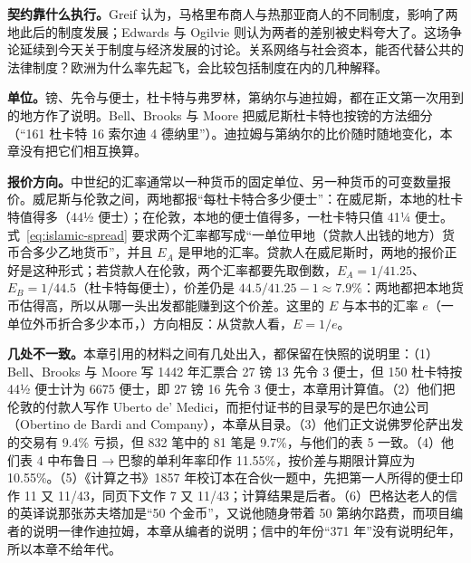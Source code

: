 \textbf{契约靠什么执行。}Greif 认为，马格里布商人与热那亚商人的不同制度，影响了两地此后的制度发展；Edwards 与 Ogilvie 则认为两者的差别被史料夸大了。这场争论延续到今天关于制度与经济发展的讨论。关系网络与社会资本，能否代替公共的法律制度？欧洲为什么率先起飞，会比较包括制度在内的几种解释。

\begin{deeper}[单位、报价方向与几处不一致]
\textbf{单位。}镑、先令与便士，杜卡特与弗罗林，第纳尔与迪拉姆，都在正文第一次用到的地方作了说明。Bell、Brooks 与 Moore 把威尼斯杜卡特也按镑的方法细分（“161 杜卡特 16 索尔迪 4 德纳里”）。迪拉姆与第纳尔的比价随时随地变化，本章没有把它们相互换算。

\textbf{报价方向。}中世纪的汇率通常以一种货币的固定单位、另一种货币的可变数量报价。威尼斯与伦敦之间，两地都报“每杜卡特合多少便士”：在威尼斯，本地的杜卡特值得多（44½ 便士）；在伦敦，本地的便士值得多，一杜卡特只值 41¼ 便士。式~\eqref{eq:islamic-spread} 要求两个汇率都写成“一单位甲地（贷款人出钱的地方）货币合多少乙地货币”，并且 $E_A$ 是甲地的汇率。贷款人在威尼斯时，两地的报价正好是这种形式；若贷款人在伦敦，两个汇率都要先取倒数，$E_A=1/41.25$、$E_B=1/44.5$（杜卡特每便士），价差仍是 $44.5/41.25-1\approx7.9\%$：两地都把本地货币估得高，所以从哪一头出发都能赚到这个价差。这里的 $E$ 与本书的汇率 $e$（一单位外币折合多少本币，）方向相反：从贷款人看，$E=1/e$。

\textbf{几处不一致。}本章引用的材料之间有几处出入，都保留在快照的说明里：（1）Bell、Brooks 与 Moore 写 1442 年汇票合 27 镑 13 先令 3 便士，但 150 杜卡特按 44½ 便士计为 6675 便士，即 27 镑 16 先令 3 便士，本章用计算值。（2）他们把伦敦的付款人写作 Uberto de' Medici，而拒付证书的目录写的是巴尔迪公司（Obertino de Bardi and Company），本章从目录。（3）他们正文说佛罗伦萨出发的交易有 9.4\% 亏损，但 832 笔中的 81 笔是 9.7\%，与他们的表 5 一致。（4）他们表 4 中布鲁日$\to$巴黎的单利年率印作 11.55\%，按价差与期限计算应为 10.55\%。（5）《计算之书》1857 年校订本在合伙一题中，先把第一人所得的便士印作 11 又 11/43，同页下文作 7 又 11/43；计算结果是后者。（6）巴格达老人的信的英译说那张苏夫塔加是“50 个金币”，又说他随身带着 50 第纳尔路费，而项目编者的说明一律作迪拉姆，本章从编者的说明；信中的年份“371 年”没有说明纪年，所以本章不给年代。
\end{deeper}

